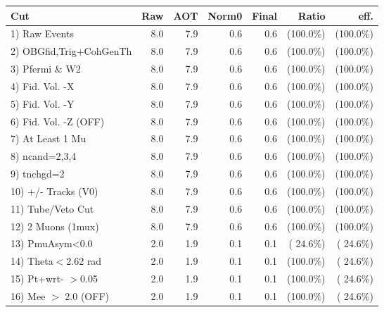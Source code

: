  \begin{table}[h!]\centering
 \begin{tabular}{||l||r|r|r|r|r|r||}
 \hline
 \hline
 Cut & Raw & AOT & Norm0 & Final & Ratio & eff.       \\
 \hline
  1) Raw Events           &          8.0 &          7.9 &          0.6 &          0.6 & (100.0\%) & (100.0\%) \\
  2) OBGfid,Trig+CohGenTh &          8.0 &          7.9 &          0.6 &          0.6 & (100.0\%) & (100.0\%) \\
  3) Pfermi \& W2         &          8.0 &          7.9 &          0.6 &          0.6 & (100.0\%) & (100.0\%) \\
  4) Fid. Vol. -X         &          8.0 &          7.9 &          0.6 &          0.6 & (100.0\%) & (100.0\%) \\
  5) Fid. Vol. -Y         &          8.0 &          7.9 &          0.6 &          0.6 & (100.0\%) & (100.0\%) \\
  6) Fid. Vol. -Z (OFF)   &          8.0 &          7.9 &          0.6 &          0.6 & (100.0\%) & (100.0\%) \\
  7) At Least 1 Mu        &          8.0 &          7.9 &          0.6 &          0.6 & (100.0\%) & (100.0\%) \\
  8) ncand=2,3,4          &          8.0 &          7.9 &          0.6 &          0.6 & (100.0\%) & (100.0\%) \\
  9) tnchgd=2             &          8.0 &          7.9 &          0.6 &          0.6 & (100.0\%) & (100.0\%) \\
 10) +/- Tracks (V0)      &          8.0 &          7.9 &          0.6 &          0.6 & (100.0\%) & (100.0\%) \\
 11) Tube/Veto Cut        &          8.0 &          7.9 &          0.6 &          0.6 & (100.0\%) & (100.0\%) \\
 12) 2 Muons (1mux)       &          8.0 &          7.9 &          0.6 &          0.6 & (100.0\%) & (100.0\%) \\
 13) PmuAsym<0.0          &          2.0 &          1.9 &          0.1 &          0.1 & ( 24.6\%) & ( 24.6\%) \\
 14) Theta$<$2.62 rad     &          2.0 &          1.9 &          0.1 &          0.1 & (100.0\%) & ( 24.6\%) \\
 15) Pt+wrt- $>$0.05      &          2.0 &          1.9 &          0.1 &          0.1 & (100.0\%) & ( 24.6\%) \\
 16) Mee $>$ 2.0  (OFF)   &          2.0 &          1.9 &          0.1 &          0.1 & (100.0\%) & ( 24.6\%) \\

\end{tabular}
\end{table}
